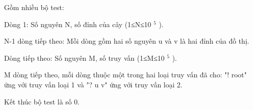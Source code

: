 Gồm nhiều bộ test:  

   Dòng 1: Số nguyên N, số đỉnh của cây (1≤N≤10   $^    5   $   ).  

   N-1 dòng tiếp theo: Mỗi dòng gồm hai số nguyên u và v là hai đỉnh của đồ thị.  

   Dòng tiếp theo: Số nguyên M, số truy vấn (1≤M≤10   $^    5   $   ).  

   M dòng tiếp theo, mỗi dòng thuộc một trong hai loại truy vấn đã cho: "! root" ứng với truy vấn loại 1 và "? u v" ứng với truy vấn loại 2.  

   Kết thúc bộ test là số 0.  

\